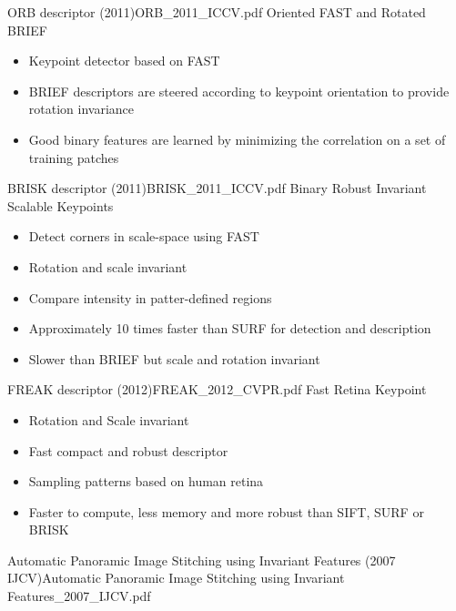 \documentclass[10pt,a4paper]{scrartcl}
\begin{document}
\begin{multicols*}{2}
\begin{Paper}{ORB descriptor (2011)}{ORB_2011_ICCV.pdf}
Oriented FAST and Rotated BRIEF

\begin{itemize}
\item Keypoint detector based on FAST
\item BRIEF descriptors are steered according to keypoint orientation to provide rotation invariance
\item Good binary features are learned by minimizing the correlation on a set of training patches
\end{itemize}
\end{Paper}

\begin{Paper}{BRISK descriptor (2011)}{BRISK_2011_ICCV.pdf}
Binary Robust Invariant Scalable Keypoints

\begin{itemize}
\item Detect corners in scale-space using FAST
\item Rotation and scale invariant
\item Compare intensity in patter-defined regions
\item Approximately 10 times faster than SURF for detection and description
\item Slower than BRIEF but scale and rotation invariant
\end{itemize}
\end{Paper}

\begin{Paper}{FREAK descriptor (2012)}{FREAK_2012_CVPR.pdf}
Fast Retina Keypoint

\begin{itemize}
\item Rotation and Scale invariant
\item Fast compact and robust descriptor
\item Sampling patterns based on human retina
\item Faster to compute, less memory and more robust than SIFT, SURF or BRISK
\end{itemize}
\end{Paper}

\begin{Paper}{Automatic Panoramic Image Stitching using Invariant Features (2007 IJCV)}{Automatic Panoramic Image Stitching using Invariant Features_2007_IJCV.pdf}
\end{Paper}


\end{multicols*}
\end{document}

